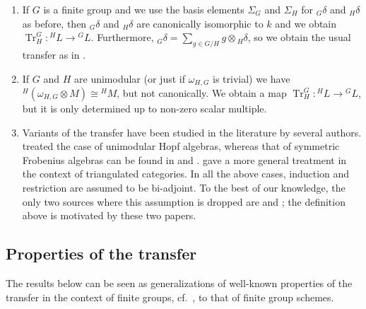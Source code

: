 \documentclass[12pt]{amsart}
\theoremstyle{definition}
\DeclareMathOperator{\Tr}{Tr}
\begin{document}
\begin{enumerate}

\item If $G$ is a finite group and we use the basis elements $\Sigma_G$ and $\Sigma_H$ for ${}_G \delta$ and ${}_H\delta$ as before, then ${}_G \delta$ and ${}_H\delta$ are canonically isomorphic to $k$ and we obtain 	$\Tr_H^G \! :  {}^HL  \rightarrow {}^G L$. Furthermore, ${}_G \delta = \sum_{g \in G/H} g \otimes {}_H \delta$, so we obtain the usual transfer as in \cite[3.6.2]{benson}. \\

\item If $G$ and $H$ are unimodular (or just if $\omega _{H,G}$ is trivial) we have ${}^H(\omega_{H,G} \otimes M) \cong {}^HM$, but not canonically. We obtain a map $\Tr_H^G \! :  {}^H L  \rightarrow {}^G L$, but it is only determined up to non-zero scalar multiple.

\item Variants of the transfer have been studied in the literature by several authors. \cite[2.11]{MR1375579} treated the case of unimodular Hopf algebras, whereas that of symmetric Frobenius algebras can be found in \cite[p.57]{MR1102964} and \cite[2.4]{MR2863463}. \cite[6.6]{MR2526081} gave a more general treatment in the context of triangulated categories. In all the above cases, induction and restriction are assumed to be bi-adjoint. To the best of our knowledge, the only two sources where this assumption is dropped are \cite[\S 6]{MR190183} and \cite[\S 2]{MR585205}; the definition above is motivated by these two papers.

\end{enumerate}



\subsection{Properties of the transfer}\label{sec:proptransfer}

The results below can be seen as generalizations of well-known properties of the transfer in the context of finite groups, cf.\ \cite[3.6.3]{benson}, to that of finite group schemes.
\end{document}
